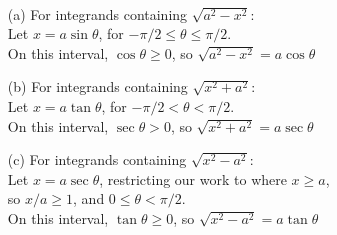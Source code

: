 {\mbox{}\\[-2\baselineskip]\begin{enumerate}
	\item[(a)] \noindent%
		For integrands containing $\sqrt{a^2-x^2}$:\smallskip\\
		Let $x=a\sin\theta$, \quad for $-\pi/2\leq \theta\leq \pi/2$. \smallskip\\
	On this interval, $\cos\theta\geq 0$, so	$\sqrt{a^2-x^2} = a\cos\theta$
		
	\item[(b)] \noindent
		For integrands containing $\sqrt{x^2+a^2}$:\smallskip\\
		Let $x=a\tan\theta$, \quad for $-\pi/2 < \theta < \pi/2$. \smallskip\\
	On this interval, $\sec\theta> 0$, so $\sqrt{x^2+a^2} = a\sec\theta$
		
	\item[(c)] \noindent
		For integrands containing $\sqrt{x^2-a^2}$:\smallskip\\
		Let $x=a\sec\theta$, \quad restricting our work to where $x\geq a$,\\
		so $x/a\geq 1$, and $0\leq\theta<\pi/2$. \smallskip\\
	On this interval, $\tan\theta\geq 0$, so	$\sqrt{x^2-a^2} = a\tan\theta$
\end{enumerate}}

